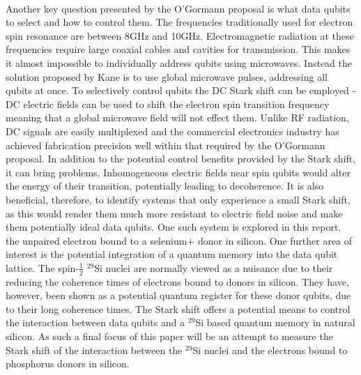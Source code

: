 \\
Another key question presented by the O'Gormann proposal is what data qubits to select and how to control them.
The frequencies traditionally used for electron spin resonance are between 8GHz and 10GHz. 
Electromagnetic radiation at these frequencies require large coaxial cables and cavities for transmission. 
This makes it almost impossible to individually address qubits using microwaves. 
Instead the solution proposed by Kane is to use global microwave pulses, addressing all qubits at once.
To selectively control qubits the DC Stark shift can be employed - DC electric fields can be used to shift the electron spin transition frequency meaning that a global microwave field will not effect them. 
Unlike RF radiation, DC signals are easily multiplexed and the commercial electronics industry has achieved fabrication precision well within that required by the O'Gormann proposal.
In addition to the potential control benefits provided by the Stark shift, it can bring problems. 
Inhomogeneous electric fields near spin qubits would alter the energy of their transition, potentially leading to decoherence.
It is also beneficial, therefore, to identify systems that only experience a small Stark shift, as this would render them much more resistant to electric field noise and make them potentially ideal data qubits.
One such system is explored in this report, the unpaired electron bound to a selenium$+$ donor in silicon.
One further area of interest is the potential integration of a quantum memory into the data qubit lattice.
The spin-$\frac{1}{2}$ $^{29}$Si nuclei are normally viewed as a nuisance due to their reducing the coherence times of electrons bound to donors in silicon.
They have, however, been shown as a potential quantum register for these donor qubits, due to their long coherence times.
The Stark shift offers a potential means to control the interaction between data qubits and a $^{29}$Si based quantum memory in natural silicon.
As such a final focus of this paper will be an attempt to measure the Stark shift of the interaction between the $^{29}$Si nuclei and the electrons bound to phosphorus donors in silicon.





